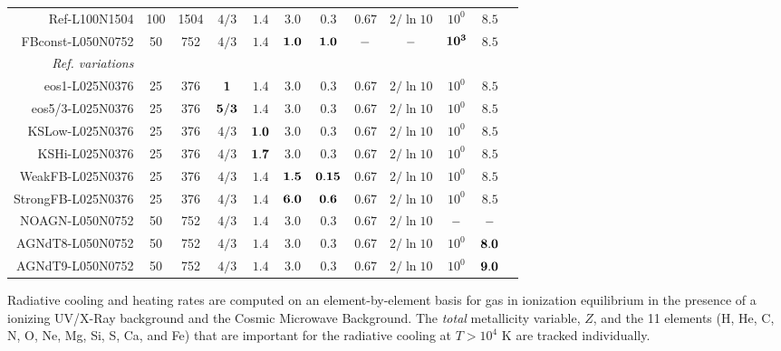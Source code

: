 \documentclass[useAMS,usenatbib]{mn2e}
\begin{document}
\begin{table*}
\begin{center}
\begin{tabular}{r c c c c c c c c c c c}
Ref-L100N1504       & 100 & 1504  & $4/3$      & $1.4$     & $3.0$      & $0.3$       & $0.67$      & $2/\ln{10}$     & $10^0$     & $8.5$ \\
FBconst-L050N0752   & 50  & 752   & $4/3$      & $1.4$     & $\bf 1.0$  & $\bf 1.0$   & $\bf -$     & $\bf -$         & $\bf 10^3$ & $8.5$ \\
\textit{Ref. variations} \\
eos1-L025N0376      & 25  & 376   & $\bf 1$    & $1.4$     & $3.0$      & $0.3$       & $0.67$      & $2/\ln{10}$     & $10^0$     & $8.5$ \\
eos5/3-L025N0376    & 25  & 376   & $\bf 5/3$  & $1.4$     & $3.0$      & $0.3$       & $0.67$      & $2/\ln{10}$     & $10^0$     & $8.5$ \\
KSLow-L025N0376 & 25  & 376   & $4/3$      & $\bf 1.0$ & $3.0$      & $0.3$       & $0.67$      & $2/\ln{10}$     & $10^0$     & $8.5$ \\
KSHi-L025N0376  & 25  & 376   & $4/3$      & $\bf 1.7$ & $3.0$      & $0.3$       & $0.67$      & $2/\ln{10}$     & $10^0$     & $8.5$ \\
WeakFB-L025N0376    & 25  & 376   & $4/3$      & $1.4$     & $\bf 1.5$  & $\bf 0.15$  & $0.67$      & $2/\ln{10}$     & $10^0$     & $8.5$ \\
StrongFB-L025N0376  & 25  & 376   & $4/3$      & $1.4$     & $\bf 6.0$  & $\bf 0.6$   & $0.67$      & $2/\ln{10}$     & $10^0$     & $8.5$ \\
NOAGN-L050N0752     & 50  & 752   & $4/3$      & $1.4$     & $3.0$      & $0.3$       & $0.67$      & $2/\ln{10}$     & $\bf -$     & $\bf -$ \\
AGNdT8-L050N0752    & 50  & 752   & $4/3$      & $1.4$     & $3.0$      & $0.3$       & $0.67$      & $2/\ln{10}$     & $10^0$     & $\bf 8.0$ \\
AGNdT9-L050N0752    & 50  & 752   & $4/3$      & $1.4$     & $3.0$      & $0.3$       & $0.67$      & $2/\ln{10}$     & $10^0$     & $\bf 9.0$ \\
\hline
\end{tabular}
\label{tab:simus}
\end{center}
\end{table*}




Radiative cooling and heating rates are computed on an element-by-element basis
for gas in ionization equilibrium in the presence of a \citet{haardt2001} ionizing
UV/X-Ray background and the Cosmic Microwave Background.  The {\em total} metallicity variable, $Z$,
and the 11 elements (H, He, C, N, O, Ne, Mg, Si, S, Ca, and Fe) that are important for
the radiative cooling at $T > 10^4$ K \citep{wiersma2009a} are
tracked individually.
\end{document}
